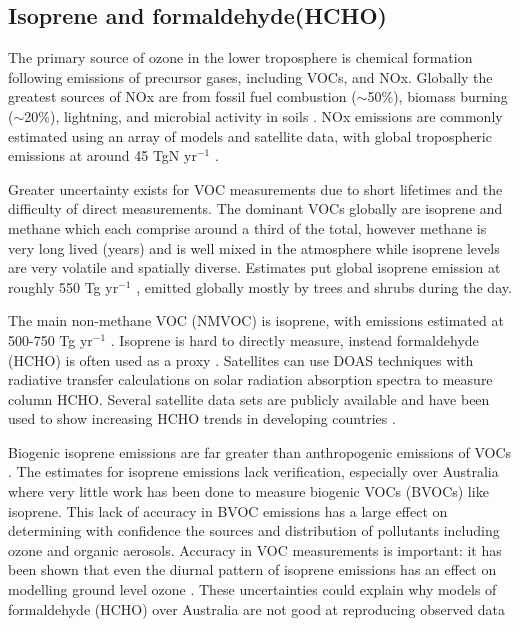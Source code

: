 \subsection{Isoprene and formaldehyde(HCHO)}

The primary source of ozone in the lower troposphere is chemical formation following emissions of precursor gases, including VOCs, and NOx.
Globally the greatest sources of NOx are from fossil fuel combustion ($\sim$50\%), biomass burning ($\sim$20\%), lightning, and microbial activity in soils \citep{Delmas_1997}.
NOx emissions are commonly estimated using an array of models and satellite data, with global tropospheric emissions at around 45 TgN yr$^{-1}$ \cite{Miyazaki_2011}.

Greater uncertainty exists for VOC measurements due to short lifetimes and the difficulty of direct measurements.
The dominant VOCs globally are isoprene and methane which each comprise around a third of the total, however methane is very long lived (years) and is well mixed in the atmosphere while isoprene levels are very volatile and spatially diverse.
Estimates put global isoprene emission at roughly 550 Tg yr$^{-1}$ \cite{Guenther_2006, Monks_2014}, emitted globally mostly by trees and shrubs during the day.

The main non-methane VOC (NMVOC) is isoprene, with emissions estimated at 500-750 Tg yr$^{-1}$ \cite{Guenther_2006}.
Isoprene is hard to directly measure, instead formaldehyde (HCHO) is often used as a proxy \cite{Marais_2012,bauwens2013satellite}.
Satellites can use DOAS techniques with radiative transfer calculations on solar radiation absorption spectra to measure column HCHO.
Several satellite data sets are publicly available and have been used to show increasing HCHO trends in developing countries \cite{Mahajan_2015}.

Biogenic isoprene emissions are far greater than anthropogenic emissions of VOCs \cite{Guenther_2006}. 
The estimates for isoprene emissions lack verification, especially over Australia where very little work has been done to measure biogenic VOCs (BVOCs) like isoprene.
This lack of accuracy in BVOC emissions has a large effect on determining with confidence the sources and distribution of pollutants including ozone and organic aerosols.
Accuracy in VOC measurements is important: it has been shown that even the diurnal pattern of isoprene emissions has an effect on modelling ground level ozone \cite{Hewitt_2011,Fan_2004}.
These uncertainties could explain why models of formaldehyde (HCHO) over Australia are not good at reproducing observed data \cite{Stavrakou_2009}

